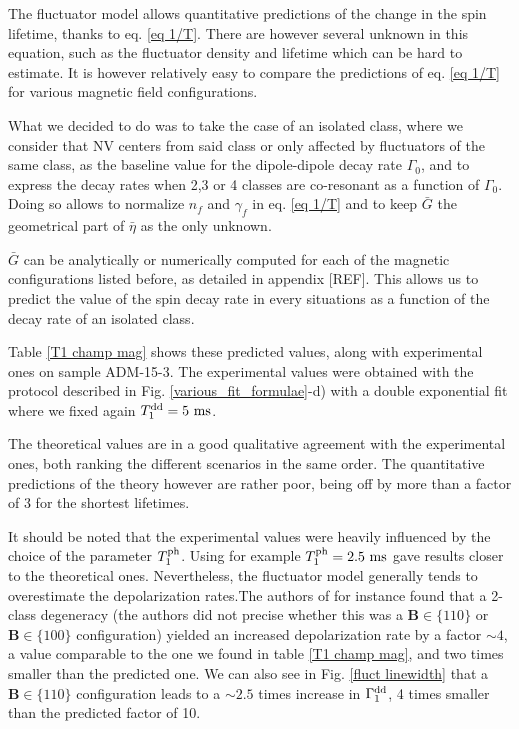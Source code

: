 \documentclass[a4paper,11pt]{report}
\begin{document}
The fluctuator model allows quantitative predictions of the change in the spin lifetime, thanks to eq. \ref{eq 1/T}. There are however several unknown in this equation, such as the fluctuator density and lifetime which can be hard to estimate. It is however relatively easy to compare the predictions of eq. \ref{eq 1/T} for various magnetic field configurations.

What we decided to do was to take the case of an isolated class, where we consider that NV centers from said class or only affected by fluctuators of the same class, as the baseline value for the dipole-dipole decay rate $\Gamma_0$, and to express the decay rates when 2,3 or 4 classes are co-resonant as a function of $\Gamma_0$. Doing so allows to normalize $n_f$ and $\gamma_f$ in eq. \ref{eq 1/T} and to keep $\bar G$ the geometrical part of $\bar \eta$ as the only unknown.

$\bar G$ can be analytically or numerically computed for each of the magnetic configurations listed before, as detailed in appendix [REF]. This allows us to predict the value of the spin decay rate in every situations as a function of the decay rate of an isolated class.

Table \ref{T1 champ mag} shows these predicted values, along with experimental ones on sample ADM-15-3. The experimental values were obtained with the protocol described in Fig. \ref{various_fit_formulae}-d) with a double exponential fit where we fixed again $T_1^{\rm dd}=5\ \rm ms$.

The theoretical values are in a good qualitative agreement with the experimental ones, both ranking the different scenarios in the same order. The quantitative predictions of the theory however are rather poor, being off by more than a factor of 3 for the shortest lifetimes.

It should be noted that the experimental values were heavily influenced by the choice of the parameter $T_1^{\rm ph}$. Using for example $T_1^{\rm ph}=2.5\ \rm ms$ gave results closer to the theoretical ones. Nevertheless, the fluctuator model generally tends to overestimate the depolarization rates.The authors of \citep{choi2017depolarization} for instance found that a 2-class degeneracy (the authors did not precise whether this was a $\mathbf{B} \in \{110\}$ or $\mathbf{B} \in \{100\}$ configuration) yielded an increased depolarization rate by a factor $\sim 4$, a value comparable to the one we found in table \ref{T1 champ mag}, and two times smaller than the predicted one. We can also see in Fig. \ref{fluct linewidth} that a $\mathbf{B} \in \{110\}$ configuration leads to a $\sim 2.5$ times increase in $\Gamma_1^{\rm dd}$, 4 times smaller than the predicted factor of 10.
\end{document}
